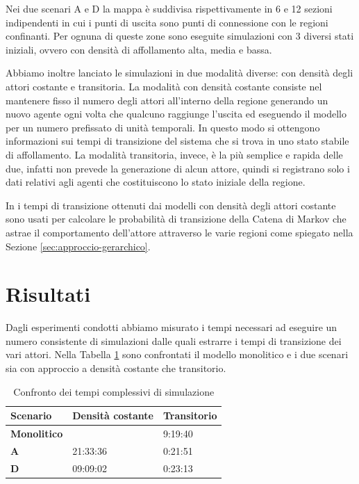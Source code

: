 Nei due scenari A e D la mappa è suddivisa rispettivamente in 6 e 12 sezioni indipendenti in cui i punti di uscita sono punti di connessione con le regioni confinanti. Per ognuna di queste zone sono eseguite simulazioni con 3 diversi stati iniziali, ovvero con densità di affollamento alta, media e bassa. 

Abbiamo inoltre lanciato le simulazioni in due modalità diverse: con densità degli attori costante e transitoria. La modalità con densità costante consiste nel mantenere fisso il numero degli attori all'interno della regione generando un nuovo agente ogni volta che qualcuno raggiunge l'uscita ed eseguendo il modello per un numero prefissato di unità temporali. In questo modo si ottengono informazioni sui tempi di transizione del sistema che si trova in uno stato stabile di affollamento. La modalità transitoria, invece, è la più semplice e rapida delle due, infatti non prevede la generazione di alcun attore, quindi si registrano solo i dati relativi agli agenti che costituiscono lo stato iniziale della regione.

In \cite{esperimenti-sandro} i tempi di transizione ottenuti dai modelli con densità degli attori costante sono usati per calcolare le probabilità di transizione della Catena di Markov che astrae il comportamento dell'attore attraverso le varie regioni come spiegato nella Sezione \ref{sec:approccio-gerarchico}.



\section{Risultati}

Dagli esperimenti condotti abbiamo misurato i tempi necessari ad eseguire un numero consistente di simulazioni dalle quali estrarre i tempi di transizione dei vari attori. Nella Tabella \ref{tab:tabella-confronto} sono confrontati il modello monolitico e i due scenari sia con approccio a densità costante che transitorio. 

\begin{table}[h]
  \centering
  \resizebox{0.7\textwidth}{!} {
  \begin{tabular}{ |l|l|l| }
	\hline
	\textbf{Scenario}	&		\textbf{Densità costante}	&		\textbf{Transitorio}	\\ \hline
	\textbf{Monolitico} &		 						&		9:19:40		\\ \hline
	\textbf{A}			 &		21:33:36 				&		0:21:51		\\ \hline
	\textbf{D}			 &		09:09:02 				&		0:23:13		\\ \hline

  \end{tabular}
  }
  \caption{Confronto dei tempi complessivi di simulazione}
  \label{tab:tabella-confronto}
\end{table}

